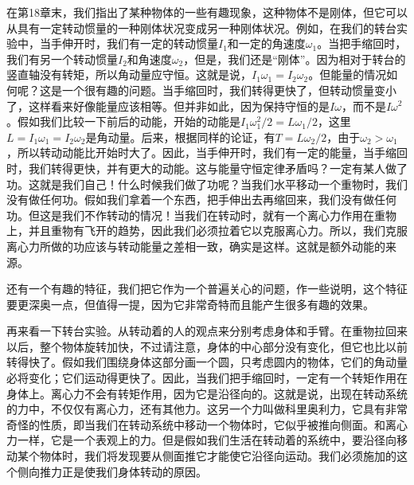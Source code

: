 在第18章末，我们指出了某种物体的一些有趣现象，这种物体不是刚体，但它可以从具有一定转动惯量的一种刚体状况变成另一种刚体状况。例如，在我们的转台实验中，当手伸开时，我们有一定的转动惯量$I_1$和一定的角速度$\omega_1$。当把手缩回时，我们有另一个转动惯量$I_2$和角速度$\omega_2$，但是，我们还是“刚体”。因为相对于转台的竖直轴没有转矩，所以角动量应守恒。这就是说，$I_1\omega_1=I_2\omega_2$。但能量的情况如何呢？这是一个很有趣的问题。当手缩回时，我们转得更快了，但转动惯量变小了，这样看来好像能量应该相等。但并非如此，因为保持守恒的是$I\omega$，而不是$I\omega^2$。假如我们比较一下前后的动能，开始的动能是$I_1\omega_1^2/2=L\omega_1/2$，这里$L=I_1\omega_1=I_2\omega_2$是角动量。后来，根据同样的论证，有$T=L\omega_2/2$，由于$\omega_2>\omega_1$，所以转动动能比开始时大了。因此，当手伸开时，我们有一定的能量，当手缩回时，我们转得更快，并有更大的动能。这与能量守恒定律矛盾吗？一定有某人做了功。这就是我们自己！什么时候我们做了功呢？当我们水平移动一个重物时，我们没有做任何功。假如我们拿着一个东西，把手伸出去再缩回来，我们没有做任何功。但这是我们不作转动的情况！当我们在转动时，就有一个离心力作用在重物上，并且重物有飞开的趋势，因此我们必须拉着它以克服离心力。所以，我们克服离心力所做的功应该与转动能量之差相一致，确实是这样。这就是额外动能的来源。

还有一个有趣的特征，我们把它作为一个普遍关心的问题，作一些说明，这个特征要更深奥一点，但值得一提，因为它非常奇特而且能产生很多有趣的效果。

再来看一下转台实验。从转动着的人的观点来分别考虑身体和手臂。在重物拉回来以后，整个物体旋转加快，不过请注意，身体的中心部分没有变化，但它也比以前转得快了。假如我们围绕身体这部分画一个圆，只考虑圆内的物体，它们的角动量必将变化；它们运动得更快了。因此，当我们把手缩回时，一定有一个转矩作用在身体上。离心力不会有转矩作用，因为它是沿径向的。这就是说，出现在转动系统的力中，不仅仅有离心力，还有其他力。这另一个力叫做科里奥利力，它具有非常奇怪的性质，即当我们在转动系统中移动一个物体时，它似乎被推向侧面。和离心力一样，它是一个表观上的力。但是假如我们生活在转动着的系统中，要沿径向移动某个物体时，我们将发现要从侧面推它才能使它沿径向运动。我们必须施加的这个侧向推力正是使我们身体转动的原因。

